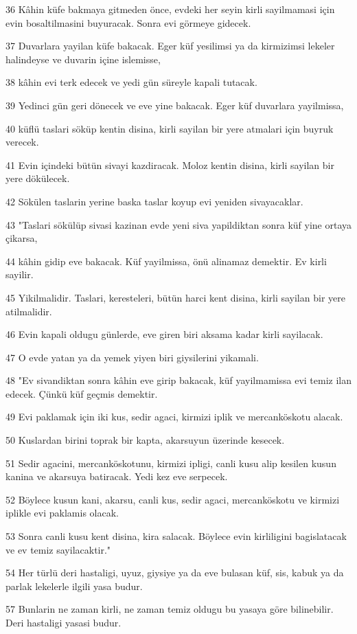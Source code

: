 \par 36 Kâhin küfe bakmaya gitmeden önce, evdeki her seyin kirli sayilmamasi için evin bosaltilmasini buyuracak. Sonra evi görmeye gidecek.
\par 37 Duvarlara yayilan küfe bakacak. Eger küf yesilimsi ya da kirmizimsi lekeler halindeyse ve duvarin içine islemisse,
\par 38 kâhin evi terk edecek ve yedi gün süreyle kapali tutacak.
\par 39 Yedinci gün geri dönecek ve eve yine bakacak. Eger küf duvarlara yayilmissa,
\par 40 küflü taslari söküp kentin disina, kirli sayilan bir yere atmalari için buyruk verecek.
\par 41 Evin içindeki bütün sivayi kazdiracak. Moloz kentin disina, kirli sayilan bir yere dökülecek.
\par 42 Sökülen taslarin yerine baska taslar koyup evi yeniden sivayacaklar.
\par 43 "Taslari sökülüp sivasi kazinan evde yeni siva yapildiktan sonra küf yine ortaya çikarsa,
\par 44 kâhin gidip eve bakacak. Küf yayilmissa, önü alinamaz demektir. Ev kirli sayilir.
\par 45 Yikilmalidir. Taslari, keresteleri, bütün harci kent disina, kirli sayilan bir yere atilmalidir.
\par 46 Evin kapali oldugu günlerde, eve giren biri aksama kadar kirli sayilacak.
\par 47 O evde yatan ya da yemek yiyen biri giysilerini yikamali.
\par 48 "Ev sivandiktan sonra kâhin eve girip bakacak, küf yayilmamissa evi temiz ilan edecek. Çünkü küf geçmis demektir.
\par 49 Evi paklamak için iki kus, sedir agaci, kirmizi iplik ve mercanköskotu alacak.
\par 50 Kuslardan birini toprak bir kapta, akarsuyun üzerinde kesecek.
\par 51 Sedir agacini, mercanköskotunu, kirmizi ipligi, canli kusu alip kesilen kusun kanina ve akarsuya batiracak. Yedi kez eve serpecek.
\par 52 Böylece kusun kani, akarsu, canli kus, sedir agaci, mercanköskotu ve kirmizi iplikle evi paklamis olacak.
\par 53 Sonra canli kusu kent disina, kira salacak. Böylece evin kirliligini bagislatacak ve ev temiz sayilacaktir."
\par 54 Her türlü deri hastaligi, uyuz, giysiye ya da eve bulasan küf, sis, kabuk ya da parlak lekelerle ilgili yasa budur.
\par 57 Bunlarin ne zaman kirli, ne zaman temiz oldugu bu yasaya göre bilinebilir. Deri hastaligi yasasi budur.

